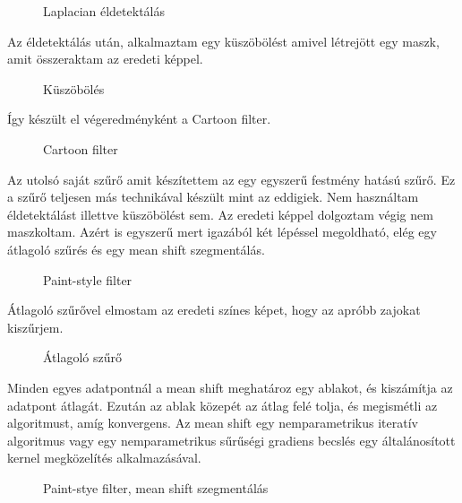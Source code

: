 \begin{figure}[ht]
\centering
{}
\caption{Laplacian éldetektálás  } 
\label{fig:  2_cartoon3}
\end{figure}
Az éldetektálás után, alkalmaztam egy küszöbölést amivel létrejött egy maszk, amit összeraktam az eredeti képpel.
\begin{figure}[ht]
\centering
{}
\caption{Küszöbölés  } 
\label{fig:  2_cartoon4}
\end{figure}
Így készült el végeredményként a Cartoon filter.
\begin{figure}[ht]
\centering
{}
\caption{Cartoon filter  } 
\label{fig:  2_cartoon4}
\end{figure}
Az utolsó saját szűrő amit készítettem az egy egyszerű festmény hatású szűrő. Ez a szűrő teljesen más technikával készült mint az eddigiek. Nem használtam éldetektálást illettve küszöbölést sem. Az eredeti képpel dolgoztam végig nem maszkoltam. Azért is egyszerű mert igazából két lépéssel megoldható, elég egy átlagoló szűrés és egy mean shift szegmentálás.
\begin{figure}[ht]
\centering
{}
\caption{Paint-style filter  } 
\label{fig:  paint}
\end{figure}
Átlagoló szűrővel elmostam az eredeti színes képet, hogy az apróbb zajokat kiszűrjem.
\begin{figure}[ht]
\centering
{}
\caption{Átlagoló szűrő  } 
\label{fig: paint1}
\end{figure}
Minden egyes adatpontnál a mean shift meghatároz egy ablakot, és kiszámítja az adatpont átlagát. Ezután az ablak közepét az átlag felé tolja, és megismétli az algoritmust, amíg konvergens. Az mean shift egy nemparametrikus iteratív algoritmus vagy egy nemparametrikus sűrűségi gradiens becslés egy általánosított kernel megközelítés alkalmazásával.
\begin{figure}[ht]
\centering
{}
\caption{Paint-stye filter, mean shift szegmentálás  } 
\label{fig: paint1}
\end{figure}




